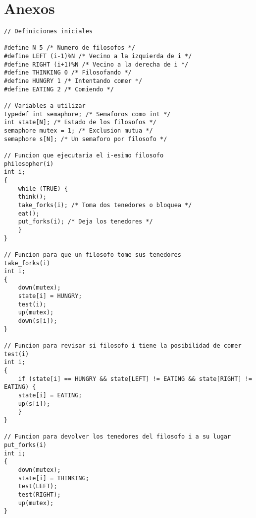 \section{Anexos}

\begin{lstlisting}[style=CodeStyle, caption={Pseudocodigo del problema de los filósofos comensales}, label={lst:Pseudocodigo}]
// Definiciones iniciales

#define N 5 /* Numero de filosofos */
#define LEFT (i-1)%N /* Vecino a la izquierda de i */
#define RIGHT (i+1)%N /* Vecino a la derecha de i */
#define THINKING 0 /* Filosofando */
#define HUNGRY 1 /* Intentando comer */
#define EATING 2 /* Comiendo */

// Variables a utilizar
typedef int semaphore; /* Semaforos como int */
int state[N]; /* Estado de los filosofos */
semaphore mutex = 1; /* Exclusion mutua */
semaphore s[N]; /* Un semaforo por filosofo */

// Funcion que ejecutaria el i-esimo filosofo
philosopher(i)
int i;
{
    while (TRUE) {
    think();
    take_forks(i); /* Toma dos tenedores o bloquea */
    eat();
    put_forks(i); /* Deja los tenedores */
    }
}

// Funcion para que un filosofo tome sus tenedores
take_forks(i)
int i;
{
    down(mutex);
    state[i] = HUNGRY;
    test(i);
    up(mutex);
    down(s[i]);
}

// Funcion para revisar si filosofo i tiene la posibilidad de comer
test(i)
int i;
{
    if (state[i] == HUNGRY && state[LEFT] != EATING && state[RIGHT] != EATING) {
    state[i] = EATING;
    up(s[i]);
    }
}

// Funcion para devolver los tenedores del filosofo i a su lugar
put_forks(i)
int i;
{
    down(mutex);
    state[i] = THINKING;
    test(LEFT);
    test(RIGHT);
    up(mutex);
}
\end{lstlisting}